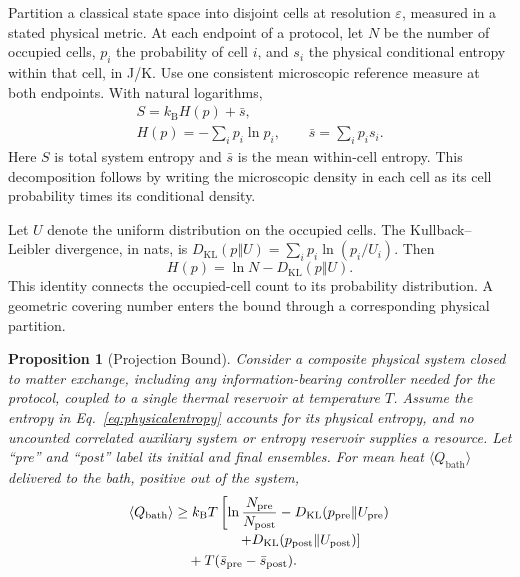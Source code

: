 \documentclass[10pt,a4paper,twocolumn]{article}
\newcommand{\kB}{k_{\mathrm B}}
\newcommand{\KL}{D_{\mathrm{KL}}}
\newtheorem{proposition}{Proposition}
\numberwithin{equation}{section}
\begin{document}
Partition a classical state space into disjoint cells at resolution $\varepsilon$, measured in a stated physical metric. At each endpoint of a protocol, let $N$ be the number of occupied cells, $p_i$ the probability of cell $i$, and $s_i$ the physical conditional entropy within that cell, in J/K. Use one consistent microscopic reference measure at both endpoints. With natural logarithms,
\begin{equation}
\begin{gathered}
S=\kB H(p)+\bar s,\\
H(p)=-\sum_i p_i\ln p_i,\qquad
\bar s=\sum_i p_i s_i .
\end{gathered}
\label{eq:physicalentropy}
\end{equation}
Here $S$ is total system entropy and $\bar s$ is the mean within-cell entropy. This decomposition follows by writing the microscopic density in each cell as its cell probability times its conditional density.

Let $U$ denote the uniform distribution on the occupied cells. The Kullback--Leibler divergence, in nats, is $\KL(p\Vert U)=\sum_i p_i\ln(p_i/U_i)$. Then
\begin{equation}
H(p)=\ln N-\KL(p\Vert U).
\label{eq:kl}
\end{equation}
This identity connects the occupied-cell count to its probability distribution. A geometric covering number enters the bound through a corresponding physical partition.

\begin{proposition}[Projection Bound]
\label{prop:projection}
Consider a composite physical system closed to matter exchange, including any information-bearing controller needed for the protocol, coupled to a single thermal reservoir at temperature $T$. Assume the entropy in Eq.~\eqref{eq:physicalentropy} accounts for its physical entropy, and no uncounted correlated auxiliary system or entropy reservoir supplies a resource. Let ``pre'' and ``post'' label its initial and final ensembles. For mean heat $\langle Q_{\mathrm{bath}}\rangle$ delivered to the bath, positive out of the system,
\begin{align}
\langle Q_{\mathrm{bath}}\rangle
&\geq \kB T\left[
\ln\frac{N_{\mathrm{pre}}}{N_{\mathrm{post}}}
-\KL(p_{\mathrm{pre}}\Vert U_{\mathrm{pre}})
\right.\nonumber\\[-2pt]
&\hspace{16mm}\left.
+\KL(p_{\mathrm{post}}\Vert U_{\mathrm{post}})
\right]\nonumber\\
&\quad+T(\bar s_{\mathrm{pre}}-\bar s_{\mathrm{post}}).
\label{eq:projection}
\end{align}
\end{proposition}
\end{document}
